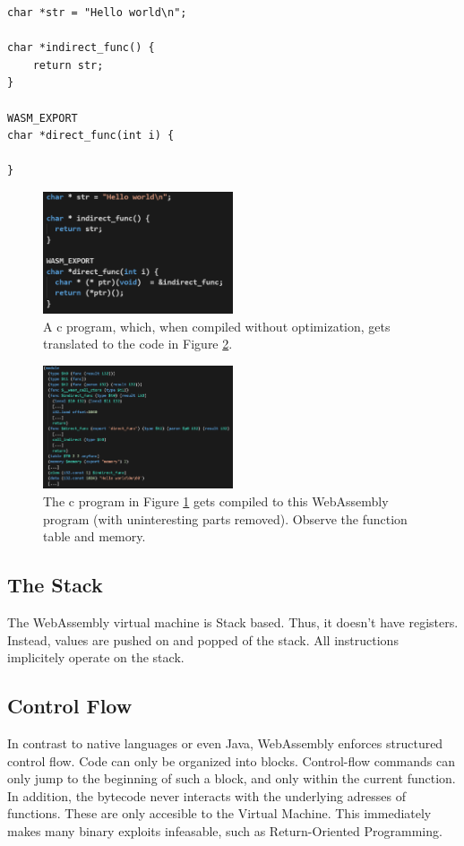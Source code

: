 \documentclass[sigconf]{acmart}
\begin{document}
\begin{lstlisting}[style=CStyle]
char *str = "Hello world\n";

char *indirect_func() {
	return str;
}

WASM_EXPORT
char *direct_func(int i) {
	
} 
\end{lstlisting}

\begin{figure}[h]
  \centering
  \includegraphics[width=0.5\textwidth]{wasm_example_c}
  \caption{A c program, which, when compiled without optimization, gets translated to the code in Figure  \ref{fig:wasm_example_wasm}.}
\label{fig:wasm_example_c}
\end{figure}

\begin{figure}[h]
  \centering
  \includegraphics[width=0.5\textwidth]{wasm_example_wasm}
  \caption{The c program in Figure \ref{fig:wasm_example_c} gets compiled to this WebAssembly program (with uninteresting parts removed). Observe the function table and memory.}  
\label{fig:wasm_example_wasm}
\end{figure}

\subsection{The Stack}
\label{sec:wasm_stack}
The WebAssembly virtual machine is Stack based. Thus, it doesn't have registers. Instead, values are pushed on and popped of the stack. All instructions implicitely operate on the stack. 

\subsection{Control Flow}
\label{sec:wasm_control_flow}
In contrast to native languages or even Java, WebAssembly enforces structured control flow. Code can only be organized into blocks. Control-flow commands can only jump to the beginning of such a block, and only within the current function. In addition, the bytecode never interacts with the underlying adresses of functions. These are only accesible to the Virtual Machine. This immediately makes many binary exploits infeasable, such as Return-Oriented Programming. 
\end{document}
